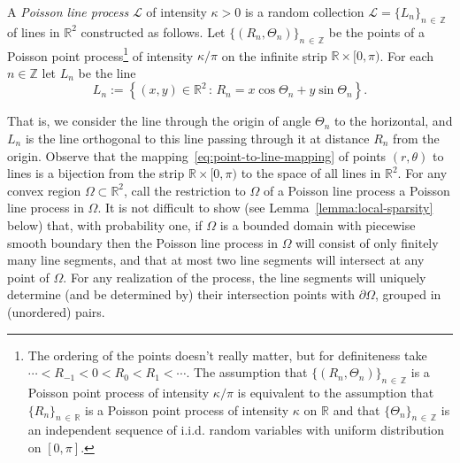 \documentclass[AHL, Unicode, longabstracts, published]{cedram}
\newcommand{\zz}[1]{\mathbb #1}
\begin{document}
\begin{defi}\label{definition:plp}
A \emph{Poisson line process} $\mathcal{L}$ of intensity $\kappa >0$ is a random collection $\mathcal{L}=\{L_{n} \}_{n\,\in\,\zz{Z}}$ of lines in $\zz{R}^{2}$ constructed as follows. Let $\{(R_{n},\Theta_{n})\}_{n\,\in\,\zz{Z}}$ be the points of a Poisson point process\footnote{The ordering of the points doesn't really matter, but for definiteness take $\dotsb <R_{-1}<0<R_{0}<R_{1}<\dotsb$. The assumption that $\{(R_{n},\Theta_{n})\}_{n\,\in\,\zz{Z}}$ is a Poisson point process of intensity $\kappa /\pi$ is equivalent to the assumption that $\{R_{n} \}_{n\,\in\, \zz{R}}$ is a Poisson point process of intensity $\kappa$ on $\zz{R}$ and that $\{\Theta_{n} \}_{n\,\in\,\zz{Z}}$ is an independent sequence of i.i.d. random variables with uniform distribution on $[0,\pi]$.} of intensity $\kappa /\pi $ on the infinite strip $\zz{R}\times [0,\pi)$. For each $n\in \zz{Z}$ let $L_{n}$ be the line
\begin{equation}\label{eq:point-to-line-mapping}
L_{n}:=\left\{(x,y)\in \zz{R}^{2}\,:\, R_{n}=x \cos \Theta_{n}+y\sin \Theta_{n}\right\}.
\end{equation}
\end{defi}

That is, we consider the line through the origin of angle $\Theta_n$ to the horizontal, and $L_n$ is the line orthogonal to this line passing through it at distance $R_n$ from the origin. Observe that the mapping~\eqref{eq:point-to-line-mapping} of points $(r,\theta)$ to lines is a bijection from the strip $\zz{R}\times[0,\pi)$ to the space of all lines in $\zz{R}^{2}$. For any convex region $\Omega \subset \zz{R}^{2}$, call the restriction to $\Omega$ of a Poisson line process a Poisson line process in $\Omega$. It is not difficult to show (see Lemma~\ref{lemma:local-sparsity} below) that, with probability one, if $\Omega$ is a bounded domain with piecewise smooth boundary then the Poisson line process in $\Omega$ will consist of only finitely many line segments, and that at most two line segments will intersect at any point of $\Omega$. For any realization of the process, the line segments will uniquely determine (and be determined by) their intersection points with $\partial \Omega$, grouped in (unordered) pairs.
\end{document}
